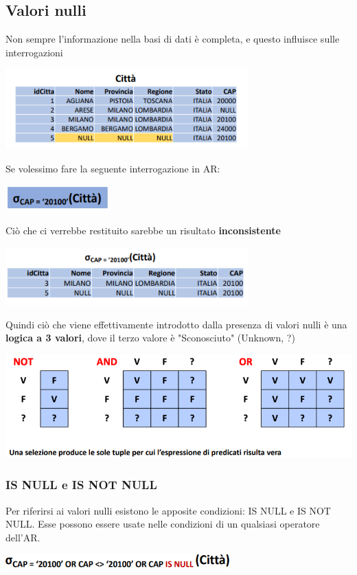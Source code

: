\documentclass[12pt]{article}
\begin{document}
\subsection{Valori nulli}
Non sempre l'informazione nella basi di dati è completa, e questo influisce sulle interrogazioni
\begin{center}
    \includegraphics[width =0.70\textwidth]{Images/153.PNG}
\end{center}
\newpage
\noindent
Se volessimo fare la seguente interrogazione in AR:
\begin{center}
    \includegraphics[width =0.30\textwidth]{Images/154.PNG}
\end{center}
Ciò che ci verrebbe restituito sarebbe un risultato \textbf{inconsistente}
\begin{center}
    \includegraphics[width =0.70\textwidth]{Images/155.PNG}
\end{center}
Quindi ciò che viene effettivamente introdotto dalla presenza di valori nulli è una \textbf{logica a 3 valori}, dove il terzo valore è "Sconosciuto" (Unknown, ?)
\begin{center}
    \includegraphics[width =1\textwidth]{Images/156.PNG}
\end{center}
\subsubsection{IS NULL e IS NOT NULL}
Per riferirsi ai valori nulli esistono le apposite condizioni: IS NULL e IS NOT NULL.
Esse possono essere usate nelle condizioni di un qualsiasi operatore dell'AR.
\begin{center}
    \includegraphics[width =0.65\textwidth]{Images/157.PNG}
\end{center}
\end{document}
